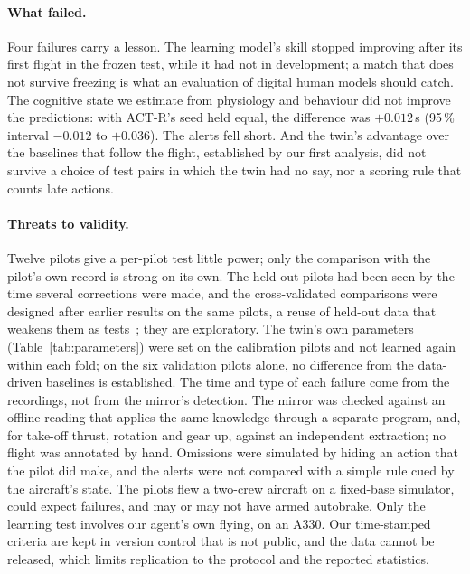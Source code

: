 \documentclass{llncs}
\begin{document}
\paragraph{What failed.} Four failures carry a lesson. The learning model's skill stopped improving after its first flight in the frozen
test, while it had not in development; a match that does not survive freezing is what an evaluation of digital human models should
catch. The cognitive state we estimate from physiology and behaviour did not improve the predictions: with ACT-R's seed held equal, the
difference was $+0.012$\,s (95\,\% interval $-0.012$ to $+0.036$). The alerts fell short. And the twin's advantage over the baselines
that follow the flight, established by our first analysis, did not survive a choice of test pairs in which the twin had no say, nor a
scoring rule that counts late actions.

\paragraph{Threats to validity.} Twelve pilots give a per-pilot test little power; only the comparison with the pilot's own record is
strong on its own. The held-out pilots had been seen by the time several corrections were made, and the cross-validated comparisons were
designed after earlier results on the same pilots, a reuse of held-out data that weakens them as tests~\cite{dwork_reusable_2015}; they
are exploratory. The twin's own parameters (Table~\ref{tab:parameters}) were set on the calibration pilots and not learned again within
each fold; on the six validation pilots alone, no difference from the data-driven baselines is established. The time and type of each
failure come from the recordings, not from the mirror's detection. The mirror was checked against an offline reading that applies the
same knowledge through a separate program, and, for take-off thrust, rotation and gear up, against an independent extraction; no flight
was annotated by hand. Omissions were simulated by hiding an action that the pilot did make, and the alerts were not compared with a
simple rule cued by the aircraft's state. The pilots flew a two-crew aircraft on a fixed-base simulator, could expect failures, and may
or may not have armed autobrake. Only the learning test involves our agent's own flying, on an A330. Our time-stamped criteria are kept
in version control that is not public, and the data cannot be released, which limits replication to the protocol and the reported
statistics.
\end{document}
